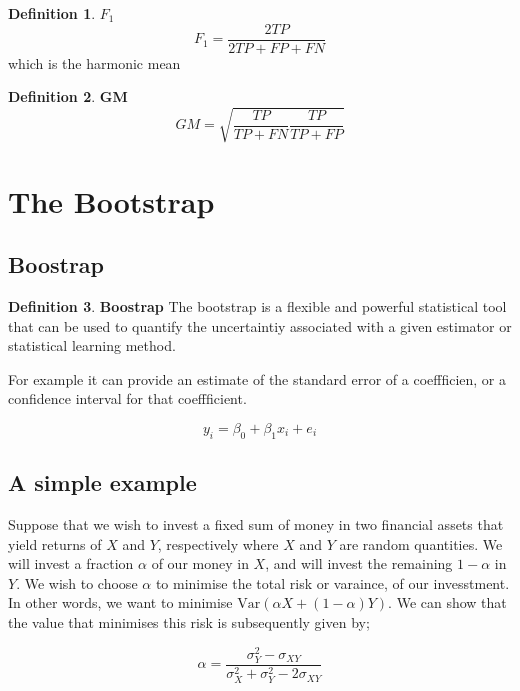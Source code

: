 \documentclass[twoside]{article}
\theoremstyle{definition}
\theoremstyle{definition}
\newtheorem*{proof1}{Definition}
\newenvironment{ddef}{\begin{dBox}\begin{proof1}}{\hfill{\scriptsize}\end{proof1}\end{dBox}}
\begin{document}
\begin{ddef}
	\textbf{$F_1$}
	\begin{equation}
		F_1 = \frac{2TP}{2TP + FP + FN}
	\end{equation}
	which is the harmonic mean
\end{ddef}

\begin{ddef}
	\textbf{GM}
	\begin{equation}
		GM = \sqrt{\frac{TP}{TP + FN}\frac{TP}{TP+FP}}
	\end{equation}
\end{ddef}

\section{The Bootstrap}
\subsection{Boostrap}
\begin{ddef}
	\textbf{Boostrap} The bootstrap is a flexible and powerful statistical tool that can be used to quantify the uncertaintiy associated with a given estimator or statistical learning method. 
\end{ddef}

For example it can provide an estimate of the standard error of a coeffficien, or a confidence interval for that coeffficient. 

\begin{equation}
	y_i = \beta_0 + \beta_1x_i  + e_i
\end{equation}

\subsection{A simple example}
Suppose that we wish to invest a fixed sum of money in two financial assets that yield returns of $X$ and $Y$, respectively where $X$ and $Y$ are random quantities. We will invest a fraction $\alpha$ of our money in $X$, and will invest the remaining $1-\alpha$ in $Y$. We wish to choose $\alpha$ to minimise the total risk or varaince, of our invesstment. In other words, we want to minimise $\text{Var} (\alpha X + (1 - \alpha)Y)$. We can show that the value that minimises this risk is subsequently given by; 

\begin{equation}
	\alpha = \frac{\sigma^2_Y - \sigma_{XY}}{\sigma^2_X + \sigma^2_Y - 2\sigma_{XY}}
\end{equation}
\end{document}
